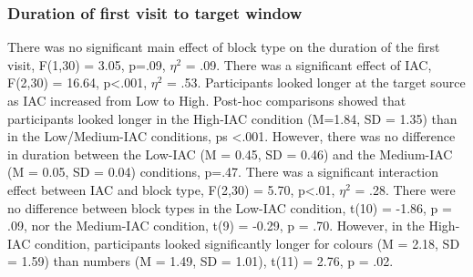 \subsubsection{Duration of first visit to target window}
There was no significant main effect of block type on the duration of the first visit, F(1,30) = 3.05, p=.09, $\eta^2$  = .09. There was a significant effect of IAC, F(2,30) = 16.64, p<.001, $\eta^2$  = .53. Participants looked longer at the target source as IAC increased from Low to High. Post-hoc comparisons showed that participants looked longer in the High-IAC condition (M=1.84, SD = 1.35) than in the Low/Medium-IAC conditions, ps <.001. However, there was no difference in duration between the Low-IAC (M = 0.45, SD = 0.46) and the Medium-IAC (M = 0.05, SD = 0.04) conditions, p=.47. There was a significant interaction effect between IAC and block type, F(2,30) = 5.70, p<.01, $\eta^2$  = .28. There were no difference between block types in the Low-IAC condition, t(10) = -1.86, p = .09, nor the Medium-IAC condition, t(9) = -0.29, p = .70. However, in the High-IAC condition, participants looked significantly longer for colours (M = 2.18, SD = 1.59) than numbers (M = 1.49, SD = 1.01), t(11) = 2.76, p = .02.

